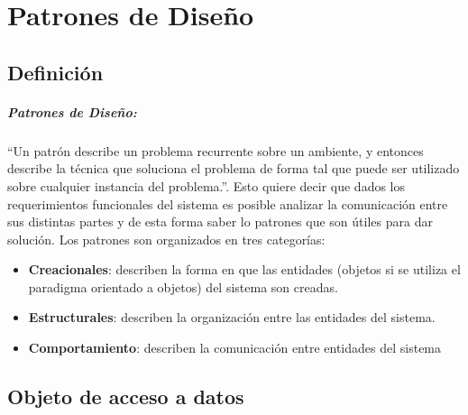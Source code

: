 \chapter{Patrones de Diseño}

\section{Definición}
\paragraph{Patrones de Diseño:} ``Un patrón describe un problema recurrente sobre un ambiente, y entonces describe la técnica que soluciona el problema de forma tal que puede ser utilizado sobre cualquier instancia del problema.''\cite{DesignPatterns}. Esto quiere decir que dados los requerimientos funcionales del sistema es posible analizar la comunicación entre sus distintas partes y de esta forma saber lo patrones que son útiles para dar solución. Los patrones son organizados en tres categorías:
\begin{itemize}
	\item \textbf{Creacionales}: describen la forma en que las entidades (objetos si se utiliza el paradigma orientado a objetos) del sistema son creadas.
	\item \textbf{Estructurales}: describen la organización entre las entidades del sistema.
	\item \textbf{Comportamiento}: describen la comunicación entre entidades del sistema
\end{itemize}

\section{Objeto de acceso a datos}\label{sec-dao}


